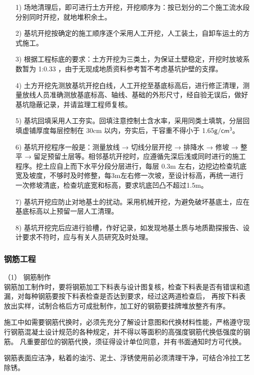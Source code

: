 \begin{itemize}
    \item [1)]场地清理后，即可进行土方开挖，开挖顺序为：按已划分的二个施工流水段分别同时开挖，就地堆积余土。
    \item [2)]基坑开挖按确定的施工顺序逐个采用人工开挖，人工装土，自卸车运土的方式施工。
    \item [3)]根据工程标底的要求：土方开挖为三类土，为保证土壁稳定，开挖时放坡系数暂为 1:0.33 ，由于无现成地质资料参考暂不考虑基坑护壁的支撑。
    \item [4)]土方开挖先测放基坑开挖白线，人工开挖至基底标高后，进行修正清理，测量放线人员准确测放基底标高、轴线、基础的外形尺寸，经自验无误后，做好基坑隐蔽记录，并请监理工程师复核。
    \item [5)]基坑回填采用人工夯实。回填注意控制土含水率，采用同类土填筑，分层回填虚铺厚度每层控制在 30cm 以内，夯实后，干容重不得小于 1.65$\mathsf{g/cm^3}$。
    \item [6)]基坑开挖程序一般是：测量放线 → 切线分层开挖 → 排降水 → 修坡 → 整平 → 留足预留土层等。相邻基坑开挖时，应遵循先深后浅或同时进行的施工程序。挖土应自上而下水平分段分层进行，每层 0.3m 左右，边挖边检查坑底宽及坡度，不够时及时修整，每3m左右修一次坡，至设计标高，再统一进行一次修坡清底，检查坑底宽和标高，要求坑底凹凸不超过1.5m。
    \item [7)]基坑开挖应防止对地基土的扰动。采用机械开挖，为避免破坏基底土，应在基底标高以上预留一层人工清理。
    \item [8)]基坑开挖完后应进行验槽，作好记录，如发现地基土质与地质勘探报告、设计要求不符时，应与有关人员研究及时处理。
\end{itemize}

\subsubsection{钢筋工程}

（1） 钢筋制作\\

钢筋加工制作时，要将钢筋加工下料表与设计图复核，检查下料表是否有错误和遗漏，对每种钢筋要按下料表检查是否达到要求，经过这两道检查后，
再按下料表放出实样，试制合格后方可成批制作，加工好的钢筋要挂牌堆放整齐有序。

施工中如需要钢筋代换时，必须先充分了解设计意图和代换材料性能，严格遵守现行钢筋混凝土设计规范的各种规定，并不得以等面积的高强度钢筋代换低强度的钢筋。
凡重要部位的钢筋代换，须征得设计单位同意，并有书面通知时方可代换。

 钢筋表面应洁净，粘着的油污、泥土、浮锈使用前必须清理干净，可结合冷拉工艺除锈。

